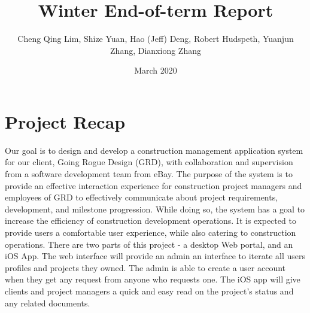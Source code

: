 \documentclass{article}
\title{Winter End-of-term Report}
\author{Cheng Qing Lim, Shize Yuan, Hao (Jeff) Deng, Robert Hudspeth, Yuanjun Zhang, Dianxiong Zhang }
\date{March 2020}
\newcommand\tab[1][0.5cm]{\hspace*{#1}}
\begin{document}
\maketitle

\section{Project Recap}
\tab Our goal is to design and develop a construction management application system for our client, Going Rogue Design (GRD), with collaboration and supervision from a software development team from eBay. The purpose of the system is to provide an effective interaction experience for construction project managers and employees of GRD to effectively communicate about project requirements, development, and milestone progression. While doing so, the system has a goal to increase the efficiency of construction development operations. It is expected to provide users a comfortable user experience, while also catering to construction operations. There are two parts of this project - a desktop Web portal, and an iOS App.\newline
\newline
\tab The web interface will provide an admin an interface to iterate all users profiles and projects they owned. The admin is able to create a user account when they get any request from anyone who requests one.\newline
\newline
\tab The iOS app will give clients and project managers a quick and easy read on the project's status and any related documents.
\end{document}
